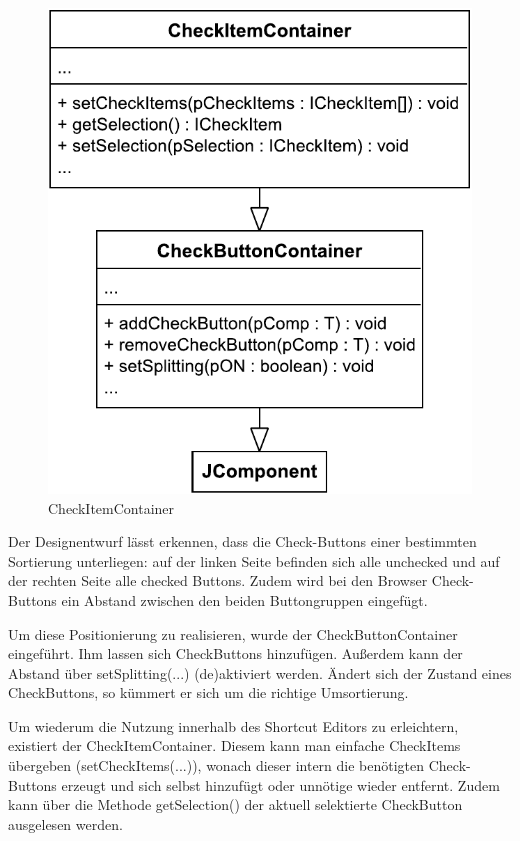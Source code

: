 \begin{figure}
	\vspace{-12px}
	\centering
	\includegraphics[width=.95\linewidth]{../graphic/diagrams/CD_CheckItemContainer/CD_CheckItemContainer}
	\caption{CheckItemContainer}
	\label{fig:cdcheckitemcontainer}
\end{figure}

Der Designentwurf lässt erkennen, dass die Check-Buttons einer bestimmten Sortierung unterliegen: auf der linken Seite befinden sich alle unchecked und auf der rechten Seite alle checked Buttons. Zudem wird bei den Browser Check-Buttons ein Abstand zwischen den beiden Buttongruppen eingefügt. 

Um diese Positionierung zu realisieren, wurde der CheckButtonContainer eingeführt. Ihm lassen sich CheckButtons hinzufügen. Außerdem kann der Abstand über setSplitting(...) (de)aktiviert werden. Ändert sich der Zustand eines CheckButtons, so kümmert er sich um die richtige Umsortierung.

Um wiederum die Nutzung innerhalb des Shortcut Editors zu erleichtern, existiert der CheckItemContainer. Diesem kann man einfache CheckItems übergeben (setCheckItems(...)), wonach dieser intern die benötigten Check-Buttons erzeugt und sich selbst hinzufügt oder unnötige wieder entfernt. Zudem kann über die Methode getSelection() der aktuell selektierte CheckButton ausgelesen werden.
\newpage